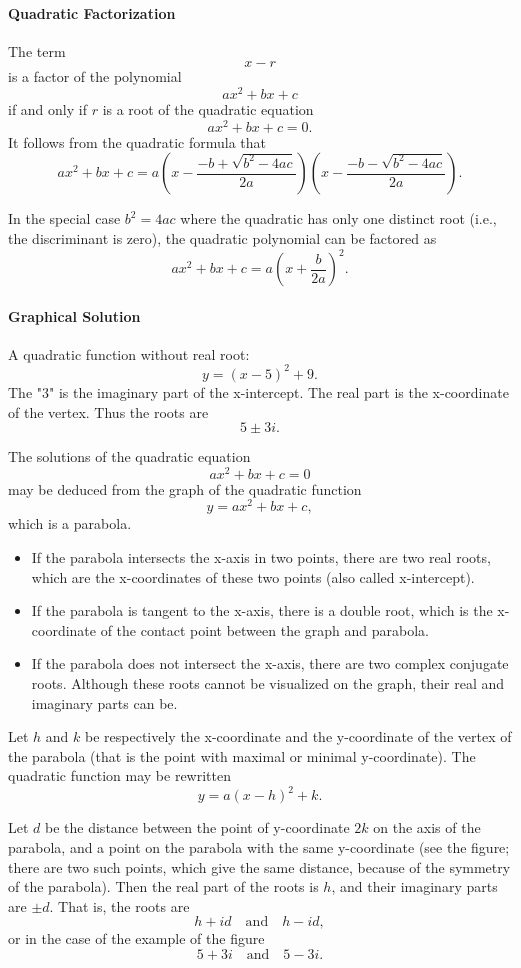 \paragraph{Quadratic Factorization}

The term 
$$x - r$$ 
is a factor of the polynomial 
$$ax^2 + bx + c$$ 
if and only if $r$ is a root of the quadratic equation 
$$ax^2 + bx + c = 0.$$ 
It follows from the quadratic formula that 
$$ax^2 + bx + c = a \left(x - \frac{-b + \sqrt{b^2 - 4ac}}{2a}\right) \left(x - \frac{-b - \sqrt{b^2 - 4ac}}{2a}\right).$$

In the special case $b^2 = 4ac$ where the quadratic has only one distinct root (i.e., the discriminant is zero), the quadratic polynomial can be factored as 
$$ax^2 + bx + c = a \left(x + \frac{b}{2a}\right)^2.$$

\paragraph{Graphical Solution}

A quadratic function without real root: $$y = (x - 5)^2 + 9.$$ The "3" is the imaginary part of the x-intercept. The real part is the x-coordinate of the vertex. Thus the roots are $$5 \pm 3i.$$

The solutions of the quadratic equation
$$ax^2 + bx + c = 0$$
may be deduced from the graph of the quadratic function
$$y = ax^2 + bx + c,$$
which is a parabola.

\begin{itemize}
    \item If the parabola intersects the x-axis in two points, there are two real roots, which are the x-coordinates of these two points (also called x-intercept).
    \item If the parabola is tangent to the x-axis, there is a double root, which is the x-coordinate of the contact point between the graph and parabola.
    \item If the parabola does not intersect the x-axis, there are two complex conjugate roots. Although these roots cannot be visualized on the graph, their real and imaginary parts can be.
\end{itemize}

Let $h$ and $k$ be respectively the x-coordinate and the y-coordinate of the vertex of the parabola (that is the point with maximal or minimal y-coordinate). The quadratic function may be rewritten
$$y = a(x - h)^2 + k.$$

Let $d$ be the distance between the point of y-coordinate $2k$ on the axis of the parabola, and a point on the parabola with the same y-coordinate (see the figure; there are two such points, which give the same distance, because of the symmetry of the parabola). Then the real part of the roots is $h$, and their imaginary parts are $\pm d$. That is, the roots are
$$h + id \quad \text{and} \quad h - id,$$
or in the case of the example of the figure
$$5 + 3i \quad \text{and} \quad 5 - 3i.$$

